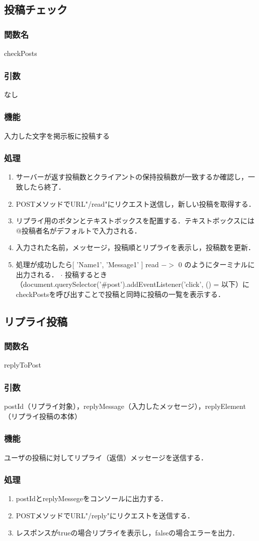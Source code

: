 \documentclass{jsarticle}
\begin{document}
\subsection*{投稿チェック}
\subsubsection*{関数名}
checkPosts
\subsubsection*{引数}
なし
\subsubsection*{機能}
入力した文字を掲示板に投稿する
\subsubsection*{処理}
\begin{enumerate}
    \item サーバーが返す投稿数とクライアントの保持投稿数が一致するか確認し，一致したら終了．
    \item POSTメソッドでURL"/read"にリクエスト送信し，新しい投稿を取得する．
    \item リプライ用のボタンとテキストボックスを配置する．テキストボックスには\>@{投稿者名}がデフォルトで入力される．
    \item 入力された名前，メッセージ，投稿順とリプライを表示し，投稿数を更新．
    \item 処理が成功したら[ 'Name1', 'Message1' ] read $->$ 0 のようにターミナルに出力される．
    $\cdot$ 投稿するとき（document.querySelector('\#post').addEventListener('click', () =\>  以下）にcheckPostsを呼び出すことで投稿と同時に投稿の一覧を表示する．
\end{enumerate}

\subsection*{リプライ投稿}
\subsubsection*{関数名}
replyToPost
\subsubsection*{引数}
postId（リプライ対象），replyMessage（入力したメッセージ），replyElement（リプライ投稿の本体）
\subsubsection*{機能}
ユーザの投稿に対してリプライ（返信）メッセージを送信する．
\subsubsection*{処理}
\begin{enumerate}
    \item postIdとreplyMessegeをコンソールに出力する．
    \item POSTメソッドでURL"/reply"にリクエストを送信する．
    \item レスポンスがtrueの場合リプライを表示し，falseの場合エラーを出力．
\end{enumerate}
\end{document}
